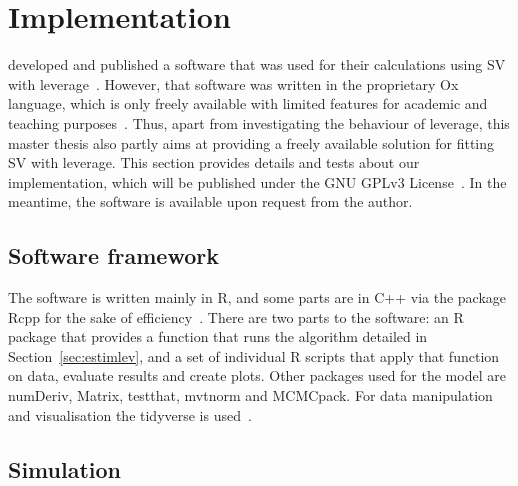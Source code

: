 \section{Implementation}

\citet{Nakajima2009} developed and published a software that was used for their calculations using SV with leverage~\citep{nakajima2009code}.
However, that software was written in the proprietary Ox language, which is only freely available with limited features for academic and teaching purposes~\citep{doornik2009object}.
Thus, apart from investigating the behaviour of leverage, this master thesis also partly aims at providing a freely available solution for fitting SV with leverage.
This section provides details and tests about our implementation, which will be published under the GNU GPLv3 License~\citep{gplv3}.
In the meantime, the software is available upon request from the author.

\subsection{Software framework}

The software is written mainly in R, and some parts are in C++ via the package Rcpp for the sake of efficiency~\citep{rlanguage,rcpp2011,iso2016iec}.
There are two parts to the software: an R package that provides a function that runs the algorithm detailed in Section~\ref{sec:estimlev}, and a set of individual R scripts that apply that function on data, evaluate results and create plots.
Other packages used for the model are numDeriv, Matrix, testthat, mvtnorm and MCMCpack.
For data manipulation and visualisation the tidyverse is used~\citep{rmcmcpack,rtestthat,rmatrix,rnumderiv,rmvtnorm,rtidyverse}.

\subsection{Simulation}\label{sec:simulation}

